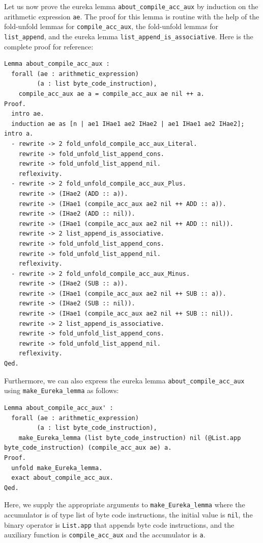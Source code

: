 \documentclass{article}
\begin{document}
Let us now prove the eureka lemma \texttt{about\_compile\_acc\_aux} by induction on the arithmetic expression \texttt{ae}. The proof for this lemma is routine with the help of the fold-unfold lemmas for \texttt{compile\_acc\_aux}, the fold-unfold lemmas for \texttt{list\_append}, and the eureka lemma \texttt{list\_append\_is\_associative}. Here is the complete proof for reference:

\begin{lstlisting}
Lemma about_compile_acc_aux :
  forall (ae : arithmetic_expression)
         (a : list byte_code_instruction),
    compile_acc_aux ae a = compile_acc_aux ae nil ++ a.
Proof.
  intro ae.
  induction ae as [n | ae1 IHae1 ae2 IHae2 | ae1 IHae1 ae2 IHae2]; intro a.
  - rewrite -> 2 fold_unfold_compile_acc_aux_Literal.
    rewrite -> fold_unfold_list_append_cons.
    rewrite -> fold_unfold_list_append_nil.
    reflexivity.
  - rewrite -> 2 fold_unfold_compile_acc_aux_Plus.
    rewrite -> (IHae2 (ADD :: a)).
    rewrite -> (IHae1 (compile_acc_aux ae2 nil ++ ADD :: a)).
    rewrite -> (IHae2 (ADD :: nil)).
    rewrite -> (IHae1 (compile_acc_aux ae2 nil ++ ADD :: nil)).
    rewrite -> 2 list_append_is_associative.
    rewrite -> fold_unfold_list_append_cons.
    rewrite -> fold_unfold_list_append_nil.
    reflexivity.
  - rewrite -> 2 fold_unfold_compile_acc_aux_Minus.
    rewrite -> (IHae2 (SUB :: a)).
    rewrite -> (IHae1 (compile_acc_aux ae2 nil ++ SUB :: a)).
    rewrite -> (IHae2 (SUB :: nil)).
    rewrite -> (IHae1 (compile_acc_aux ae2 nil ++ SUB :: nil)).
    rewrite -> 2 list_append_is_associative.
    rewrite -> fold_unfold_list_append_cons.
    rewrite -> fold_unfold_list_append_nil.
    reflexivity.
Qed. 
\end{lstlisting}

Furthermore, we can also express the eureka lemma \texttt{about\_compile\_acc\_aux} using \texttt{make\_Eureka\_lemma} as follows:

\begin{lstlisting}
Lemma about_compile_acc_aux' :
  forall (ae : arithmetic_expression)
         (a : list byte_code_instruction),
    make_Eureka_lemma (list byte_code_instruction) nil (@List.app byte_code_instruction) (compile_acc_aux ae) a.
Proof.
  unfold make_Eureka_lemma.
  exact about_compile_acc_aux.
Qed.
\end{lstlisting}

Here, we supply the appropriate arguments to \texttt{make\_Eureka\_lemma} where the accumulator is of type list of byte code instructions, the initial value is \texttt{nil}, the binary operator is \texttt{List.app} that appends byte code instructions, and the auxiliary function is \texttt{compile\_acc\_aux} and the accumulator is \texttt{a}.
\end{document}

